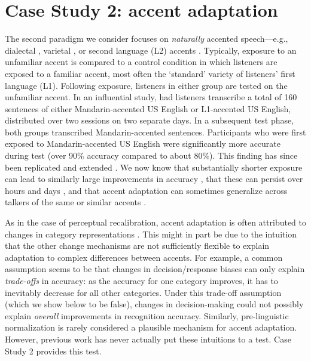 \documentclass[
  11pt,
  man,floatsintext]{apa6}
\begin{document}
\hypertarget{sec:AA}{%
\section{Case Study 2: accent adaptation}\label{sec:AA}}

The second paradigm we consider focuses on \emph{naturally} accented speech---e.g., dialectal \autocite{smith2014}, varietal \autocite{shaw2018}, or second language (L2) accents \autocite{bradlow-bent2008,eisner2013,sidaras2009,weil2001a}. Typically, exposure to an unfamiliar accent is compared to a control condition in which listeners are exposed to a familiar accent, most often the `standard' variety of listeners' first language (L1). Following exposure, listeners in either group are tested on the unfamiliar accent. In an influential study, \textcite{bradlow-bent2008} had listeners transcribe a total of 160 sentences of either Mandarin-accented US English or L1-accented US English, distributed over two sessions on two separate days. In a subsequent test phase, both groups transcribed Mandarin-accented sentences. Participants who were first exposed to Mandarin-accented US English were significantly more accurate during test (over 90\% accuracy compared to about 80\%). This finding has since been replicated and extended \autocite[for review, see][]{baeseberk2020}. We now know that substantially shorter exposure can lead to similarly large improvements in accuracy \autocite[e.g., 80 sentences in a single session, about 2-5 minutes of speech,][]{xie2021jep}, that these can persist over hours and days \autocite{witteman2015,xie2018lcn}, and that accent adaptation can sometimes generalize across talkers of the same or similar accents \autocites[e.g.,][]{baeseberk2013,tzeng2016,xie2021jep}.

As in the case of perceptual recalibration, accent adaptation is often attributed to changes in category representations \autocites[e.g.,][]{bent-baeseberk2021,sidaras2009,eisner2013,sumner2009,tzeng2016,xie2016jep}. This might in part be due to the intuition that the other change mechanisms are not sufficiently flexible to explain adaptation to complex differences between accents. For example, a common assumption seems to be that changes in decision/response biases can only explain \emph{trade-offs} in accuracy: as the accuracy for one category improves, it has to inevitably decrease for all other categories. Under this trade-off assumption (which we show below to be false), changes in decision-making could not possibly explain \emph{overall} improvements in recognition accuracy. Similarly, pre-linguistic normalization is rarely considered a plausible mechanism for accent adaptation. However, previous work has never actually put these intuitions to a test. Case Study 2 provides this test.
\end{document}
